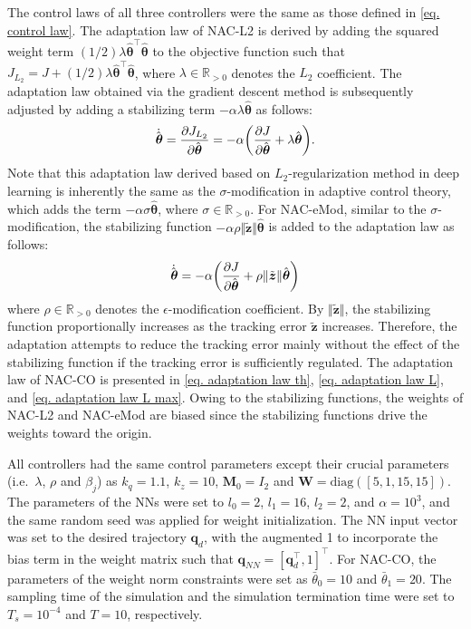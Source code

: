 \documentclass[letterpaper, 10 pt, conference]{ieeeconf}  %
\newcommand\ie{\textrm{i.e.\ }}
\newcommand\R{\mathbb{R}}
\newcommand*{\mv}[1]{\boldsymbol{#1}}
\newcommand*{\mm}[1]{\boldsymbol{#1}}
\begin{document}
The control laws of all three controllers were the same as those defined in \eqref{eq. control law}.
The adaptation law of NAC-L2 is derived by adding the squared weight term $(1/2)\lambda{\hat{\mv\theta}}^\top {\hat{\mv\theta}}$ to the objective function such that $J_{L_2} = J+(1/2)\lambda{\hat{\mv\theta}}^\top {\hat{\mv\theta}}$, where $\lambda\in\R_{>0}$ denotes the $L_2$ coefficient.
The adaptation law obtained via the gradient descent method is subsequently adjusted by adding a stabilizing term $-\alpha\lambda{\hat{\mv\theta}}$ as follows:
\begin{equation} 
    \dot{{\hat{\mv\theta}}} = 
    {\partial J_{L_2}\over\partial {\hat{\mv\theta}}}
    =-\alpha
    \bigg(
        {\partial J\over\partial {\hat{\mv\theta}}}+\lambda{\hat{\mv\theta}}
    \bigg)
    .
    \label{eq. adap L2}
\end{equation}
Note that this adaptation law derived based on $L_2$-regularization method in deep learning is inherently the same as the $\sigma$-modification in adaptive control theory, which adds the term $-\alpha\sigma{\hat{\mv\theta}}$, where $\sigma\in\R_{>0}$.
For NAC-eMod, similar to the $\sigma$-modification, the stabilizing function $-\alpha\rho\Vert \tilde{\mv z} \Vert{\hat{\mv\theta}}$ is added to the adaptation law as follows:
\begin{equation}
    \dot{{\hat{\mv\theta}}} = -\alpha
    \bigg(
        {\partial J\over\partial {\hat{\mv\theta}}}+\rho\Vert\tilde {\mv z}\Vert{\hat{\mv\theta}}
    \bigg)
    \label{eq. adap eMod}
\end{equation}
where $\rho\in\R_{>0}$ denotes the $\epsilon$-modification coefficient.
By $\Vert\tilde {\mv z}\Vert$, the stabilizing function proportionally increases as the tracking error $\tilde {\mv z}$ increases.
Therefore, the adaptation attempts to reduce the tracking error mainly without the effect of the stabilizing function if the tracking error is sufficiently regulated.
The adaptation law of NAC-CO is presented in \eqref{eq. adaptation law th}, \eqref{eq. adaptation law L}, and \eqref{eq. adaptation law L max}.
Owing to the stabilizing functions, the weights of NAC-L2 and NAC-eMod are biased since the stabilizing functions drive the weights toward the origin.

All controllers had the same control parameters except their crucial parameters (\ie $\lambda$, $\rho$ and $\beta_j$) as $k_q=1.1$, $k_z=10$, $\mm M_0=I_2$ and $\mm W=\text{diag}([5,1,15,15])$.
The parameters of the NNs were set to $l_0=2$, $l_1=16$, $l_2=2$, and $\alpha=10^3$, and the same random seed was applied for weight initialization.
The NN input vector was set to the desired trajectory $\mv q_d$, with the augmented 1 to incorporate the bias term in the weight matrix such that $\mv q_{NN}=[\mv q_d^\top ,1]^\top $.
For NAC-CO, the parameters of the weight norm constraints were set as $\bar\theta_0=10$ and $\bar\theta_1=20$.
The sampling time of the simulation and the simulation termination time were set to $T_s=10^{-4}$ and $T=10$, respectively.
\end{document}
